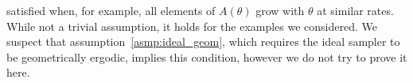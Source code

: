 satisfied when, for example, all elements of $A(\theta)$ grow with 
$\theta$ at similar rates.
While not a trivial assumption, it holds for the examples we 
considered. %
We suspect that assumption~\ref{asmp:ideal_geom}, which requires 
the ideal sampler to be geometrically ergodic, implies this condition,
however we do not try to prove it here.


